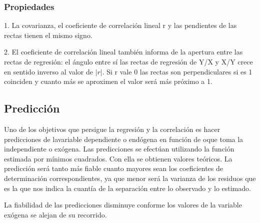 \documentclass{article}
\theoremstyle{definition}
\begin{document}
\subsubsection{Propiedades}

1. La covarianza, el coeficiente de correlación lineal r y las pendientes de las
rectas tienen el mismo signo.

2. El coeficiente de correlación lineal también informa de la apertura entre las
rectas de regresión: el ángulo entre sí las rectas de regresión de Y/X y X/Y
crece en sentido inverso al valor de $ |r| $. Si r vale 0 las rectas son
perpendiculares si es 1 coinciden y cuanto más se aproximen el valor será más
próximo a 1.

\subsection{Predicción}

Uno de los objetivos que persigue la regresión y la correlación es hacer
predicciones de lavariable dependiente o endógena en función de oque toma la
independiente o exógena. Las predicciones se efectúan utilizando la función
estimada por mínimos cuadrados. Con ella se obtienen valores teóricos. La
predicción será tanto más fiable cuanto mayores sean los coeficientes de
determinación correspondientes, ya que menor será la varianza de los residuos
que es la que nos indica la cuantía de la separación entre lo observado y lo
estimado.

La fiabilidad de las predicciones disminuye conforme los valores de la variable
exógena se alejan de su recorrido.
\end{document}
